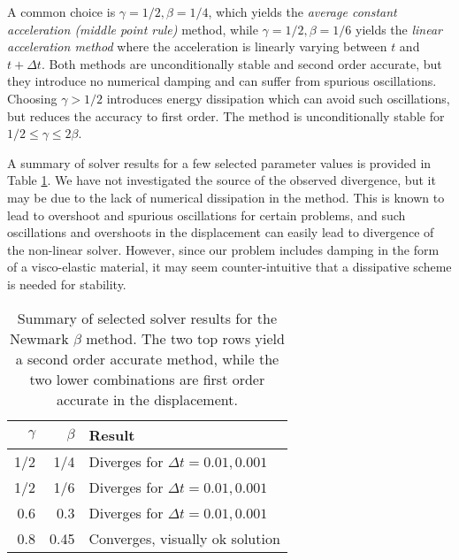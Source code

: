 \documentclass[a4paper,10pt]{article}
\begin{document}
A common choice is $\gamma=1/2, \beta=1/4$, which yields
the \emph{average constant acceleration (middle point rule)} method, while $\gamma=1/2, \beta=1/6$
yields the \emph{linear acceleration method} where the acceleration is linearly varying between
$t$ and $t+\Delta t$. Both methods are unconditionally stable and second order accurate, but
they introduce no numerical damping and can suffer from spurious oscillations. Choosing $\gamma > 1/2$
introduces energy dissipation which can avoid such oscillations, but reduces the
accuracy to first order. The method is unconditionally stable for $1/2 \leq \gamma \leq 2\beta$.

A summary of solver results for a few selected parameter values is provided in
Table \ref{tab:conv_res}. We have not investigated the source of the
observed divergence, but it may be due to the lack of
numerical dissipation in the method. This is known to lead to overshoot
and spurious oscillations for certain problems, and such oscillations and
overshoots in the displacement can easily lead to divergence of the non-linear
solver. However, since our problem includes damping in the form of a visco-elastic
material, it may seem counter-intuitive that a dissipative scheme is needed for stability.

\begin{table}[htb]
  \begin{center}
    \begin{tabular}{|r|r|l|}
      \hline
      $\gamma$ & $\beta $& Result \\
      \hline \hline
      1/2 & 1/4 &  Diverges for $\Delta t = 0.01, 0.001$ \\ \hline
      1/2 & 1/6 &  Diverges for $\Delta t = 0.01, 0.001$ \\ \hline
      0.6 & 0.3 & Diverges for $\Delta t = 0.01, 0.001$ \\ \hline
      0.8 & 0.45 & Converges, visually ok solution \\ \hline
    \end{tabular}
  \end{center}
  \caption{Summary of selected solver results for the Newmark $\beta$ method. The two
  top rows yield a second order accurate method, while the two lower combinations
  are first order accurate in the displacement.}
  \label{tab:conv_res}
\end{table}
\end{document}
